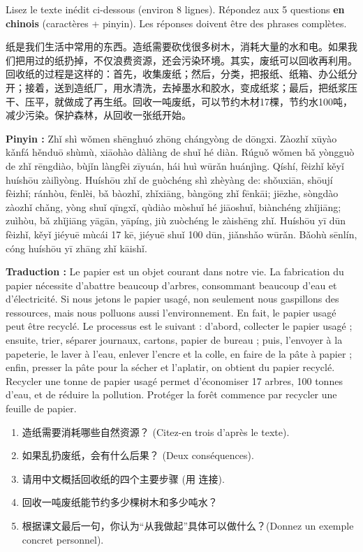 \documentclass[11pt]{article}
\newcommand{\zh}[1]{\ifmmode\text{#1}\else{#1}\fi}
\begin{document}
\begin{exercice}
Lisez le texte inédit ci-dessous (environ 8 lignes). Répondez aux 5 questions \textbf{en chinois} (caractères + pinyin). Les réponses doivent être des phrases complètes.

\begin{textebox}
纸是我们生活中常用的东西。造纸需要砍伐很多树木，消耗大量的水和电。如果我们把用过的纸扔掉，不仅浪费资源，还会污染环境。其实，废纸可以回收再利用。回收纸的过程是这样的：首先，收集废纸；然后，分类，把报纸、纸箱、办公纸分开；接着，送到造纸厂，用水清洗，去掉墨水和胶水，变成纸浆；最后，把纸浆压干、压平，就做成了再生纸。回收一吨废纸，可以节约木材17棵，节约水100吨，减少污染。保护森林，从回收一张纸开始。
\par
\textbf{Pinyin :} Zhǐ shì wǒmen shēnghuó zhōng chángyòng de dōngxi. Zàozhǐ xūyào kǎnfá hěnduō shùmù, xiāohào dàliàng de shuǐ hé diàn. Rúguǒ wǒmen bǎ yòngguò de zhǐ rēngdiào, bùjǐn làngfèi zīyuán, hái huì wūrǎn huánjìng. Qíshí, fèizhǐ kěyǐ huíshōu zàilìyòng. Huíshōu zhǐ de guòchéng shì zhèyàng de: shǒuxiān, shōují fèizhǐ; ránhòu, fēnlèi, bǎ bàozhǐ, zhǐxiāng, bàngōng zhǐ fēnkāi; jiēzhe, sòngdào zàozhǐ chǎng, yòng shuǐ qīngxǐ, qùdiào mòshuǐ hé jiāoshuǐ, biànchéng zhǐjiāng; zuìhòu, bǎ zhǐjiāng yāgān, yāpíng, jiù zuòchéng le zàishēng zhǐ. Huíshōu yī dūn fèizhǐ, kěyǐ jiéyuē mùcái 17 kē, jiéyuē shuǐ 100 dūn, jiǎnshǎo wūrǎn. Bǎohù sēnlín, cóng huíshōu yī zhāng zhǐ kāishǐ.
\par
\textbf{Traduction :} Le papier est un objet courant dans notre vie. La fabrication du papier nécessite d'abattre beaucoup d'arbres, consommant beaucoup d'eau et d'électricité. Si nous jetons le papier usagé, non seulement nous gaspillons des ressources, mais nous polluons aussi l'environnement. En fait, le papier usagé peut être recyclé. Le processus est le suivant : d'abord, collecter le papier usagé ; ensuite, trier, séparer journaux, cartons, papier de bureau ; puis, l'envoyer à la papeterie, le laver à l'eau, enlever l'encre et la colle, en faire de la pâte à papier ; enfin, presser la pâte pour la sécher et l'aplatir, on obtient du papier recyclé. Recycler une tonne de papier usagé permet d'économiser 17 arbres, 100 tonnes d'eau, et de réduire la pollution. Protéger la forêt commence par recycler une feuille de papier.
\end{textebox}

\begin{enumerate}
    \item 造纸需要消耗哪些自然资源？ (Citez-en trois d'après le texte).
    \item 如果乱扔废纸，会有什么后果？ (Deux conséquences).
    \item 请用中文概括回收纸的四个主要步骤 (用 \zh{首先、然后、接着、最后} 连接).
    \item 回收一吨废纸能节约多少棵树木和多少吨水？
    \item 根据课文最后一句，你认为“从我做起”具体可以做什么？(Donnez un exemple concret personnel).
\end{enumerate}
\end{exercice}
\end{document}
